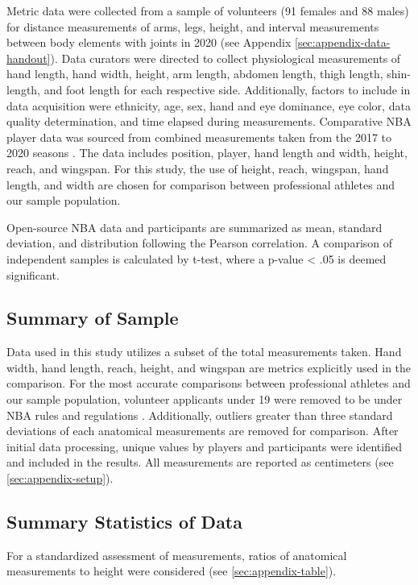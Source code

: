 \documentclass[]{article}
\begin{document}
Metric data were collected from a sample of volunteers (91 females and
88 males) for distance measurements of arms, legs, height, and interval
measurements between body elements with joints in 2020 (see Appendix
\ref{sec:appendix-data-handout}). Data curators were directed to collect
physiological measurements of hand length, hand width, height, arm
length, abdomen length, thigh length, shin-length, and foot length for
each respective side. Additionally, factors to include in data
acquisition were ethnicity, age, sex, hand and eye dominance, eye color,
data quality determination, and time elapsed during measurements.
Comparative NBA player data was sourced from combined measurements taken
from the 2017 to 2020 seasons \citep{NBA:Stats}. The data includes
position, player, hand length and width, height, reach, and wingspan.
For this study, the use of height, reach, wingspan, hand length, and
width are chosen for comparison between professional athletes and our
sample population.

Open-source NBA data and participants are summarized as mean, standard
deviation, and distribution following the Pearson correlation. A
comparison of independent samples is calculated by t-test, where a
p-value \textless{} .05 is deemed significant.

\subsection{Summary of Sample}
\label{sec:data-sample}

Data used in this study utilizes a subset of the total measurements
taken. Hand width, hand length, reach, height, and wingspan are metrics
explicitly used in the comparison. For the most accurate comparisons
between professional athletes and our sample population, volunteer
applicants under 19 were removed to be under NBA rules and regulations
\citep{reynolds:2019}. Additionally, outliers greater than three
standard deviations of each anatomical measurements are removed for
comparison. After initial data processing, unique values by players and
participants were identified and included in the results. All
measurements are reported as centimeters (see \ref{sec:appendix-setup}).

\subsection{Summary Statistics of Data}
\label{sec:data-summary}

For a standardized assessment of measurements, ratios of anatomical
measurements to height were considered (see \ref{sec:appendix-table}).
\end{document}
